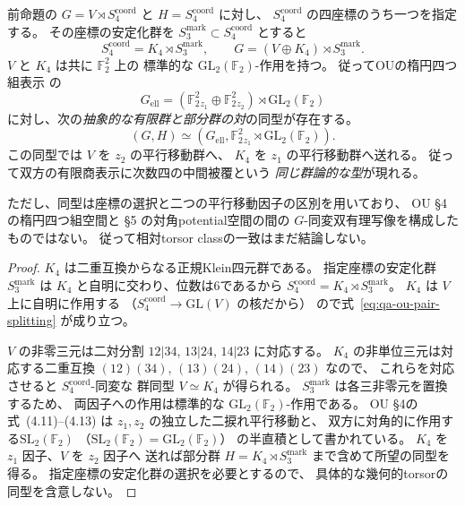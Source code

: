\begin{proposition}
\label{prop:qa-ou-sign-elliptic-groups-pair}
前命題の $G=V\rtimes S_4^{\mathrm{coord}}$ と
$H=S_4^{\mathrm{coord}}$ に対し、
$S_4^{\mathrm{coord}}$ の四座標のうち一つを指定する。
その座標の安定化群を
$S_3^{\mathrm{mark}}\subset S_4^{\mathrm{coord}}$ とすると
\[
 S_4^{\mathrm{coord}}=K_4\rtimes S_3^{\mathrm{mark}},
 \qquad
 G=(V\oplus K_4)\rtimes S_3^{\mathrm{mark}}.
 \tag{OU-split}\label{eq:qa-ou-pair-splitting}
\]
$V$ と $K_4$ は共に $\mathbb F_2^2$ 上の
標準的な $\mathrm{GL}_2(\mathbb F_2)$-作用を持つ。
従ってOUの楕円四つ組表示
\cite[\S4, (4.11)--(4.13)]{OU2014} の
\[
 G_{\mathrm{ell}}=
 (\mathbb F_2^2{}_{z_1}\oplus
  \mathbb F_2^2{}_{z_2})
     \rtimes\mathrm{GL}_2(\mathbb F_2)
\]
に対し、次の\emph{抽象的な有限群と部分群の対}の同型が存在する。
\[
 (G,H)\simeq
 \left(G_{\mathrm{ell}},
       \mathbb F_2^2{}_{z_1}
         \rtimes\mathrm{GL}_2(\mathbb F_2)\right).
 \tag{OU-pair}\label{eq:qa-ou-elliptic-finite-pair}
\]
この同型では $V$ を $z_2$ の平行移動群へ、
$K_4$ を $z_1$ の平行移動群へ送れる。
従って双方の有限商表示に次数四の中間被覆という
\emph{同じ群論的な型}が現れる。

ただし、同型は座標の選択と二つの平行移動因子の区別を用いており、
OU §4 の楕円四つ組空間と §5 の対角potential空間の間の
$G$-同変双有理写像を構成したものではない。
従って相対torsor classの一致はまだ結論しない。
\end{proposition}
\begin{proof}
$K_4$ は二重互換からなる正規Klein四元群である。
指定座標の安定化群 $S_3^{\mathrm{mark}}$ は
$K_4$ と自明に交わり、位数は6であるから
$S_4^{\mathrm{coord}}=K_4\rtimes S_3^{\mathrm{mark}}$。
$K_4$ は $V$ 上に自明に作用する
（$S_4^{\mathrm{coord}}\to\mathrm{GL}(V)$ の核だから）
ので式~\eqref{eq:qa-ou-pair-splitting} が成り立つ。

$V$ の非零三元は二対分割
$12|34$, $13|24$, $14|23$ に対応する。
$K_4$ の非単位三元は対応する二重互換
$(12)(34)$, $(13)(24)$, $(14)(23)$ なので、
これらを対応させると $S_4^{\mathrm{coord}}$-同変な
群同型 $V\simeq K_4$ が得られる。
$S_3^{\mathrm{mark}}$ は各三非零元を置換するため、
両因子への作用は標準的な
$\mathrm{GL}_2(\mathbb F_2)$-作用である。
OU §4の式~(4.11)--(4.13) は
$z_1,z_2$ の独立した二捩れ平行移動と、
双方に対角的に作用する$\mathrm{SL}_2(\mathbb F_2)$
（$\mathrm{SL}_2(\mathbb F_2)=\mathrm{GL}_2(\mathbb F_2)$）
の半直積として書かれている。
$K_4$ を $z_1$ 因子、$V$ を $z_2$ 因子へ
送れば部分群 $H=K_4\rtimes S_3^{\mathrm{mark}}$
まで含めて所望の同型を得る。
指定座標の安定化群の選択を必要とするので、
具体的な幾何的torsorの同型を含意しない。
\end{proof}

